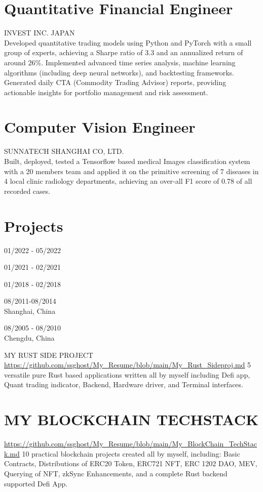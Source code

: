 \documentclass[10pt]{article}
\begin{document}
\section*{Quantitative Financial Engineer}
INVEST INC. JAPAN\\
Developed quantitative trading models using Python and PyTorch with a small group of experts, achieving a Sharpe ratio of 3.3 and an annualized return of around 26\%. Implemented advanced time series analysis, machine learning algorithms (including deep neural networks), and backtesting frameworks. Generated daily CTA (Commodity Trading Advisor) reports, providing actionable insights for portfolio management and risk assessment.

\section*{Computer Vision Engineer}
SUNNATECH SHANGHAI CO, LTD.\\
Built, deployed, tested a Tensorflow based medical Images classification system with a 20 members team and applied it on the primitive screening of 7 diseases in 4 local clinic radiology departments, achieving an over-all F1 score of 0.78 of all recorded cases.

\section*{Projects}
01/2022 - 05/2022

01/2021 - 02/2021

01/2018 - 02/2018

08/2011-08/2014\\
Shanghai, China

08/2005 - 08/2010\\
Chengdu, China

MY RUST SIDE PROJECT\\
\href{https://github.com/ssghost/My_Resume/blob/main/My_Rust_Sideproj.md}{https://github.com/ssghost/My\_Resume/blob/main/My\_Rust\_Sideproj.md} 5 versatile pure Rust based applications written all by myself including Defi app, Quant trading indicator, Backend, Hardware driver, and Terminal interfaces.

\section*{MY BLOCKCHAIN TECHSTACK}
\href{https://github.com/ssghost/My_Resume/blob/main/My_BlockChain_TechStack.md}{https://github.com/ssghost/My\_Resume/blob/main/My\_BlockChain\_TechStack.md} 10 practical blockchain projects created all by myself, including: Basic Contracts, Distributions of ERC20 Token, ERC721 NFT, ERC 1202 DAO, MEV, Querying of NFT, zkSync Enhancements, and a complete Rust backend supported Defi App.
\end{document}
